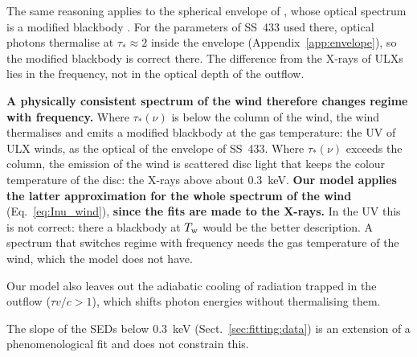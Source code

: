  
The same reasoning applies to the spherical envelope of \citet{Lipunova1999}, whose optical spectrum is a modified blackbody \citep{ZeldovichShakura1969}.
For the parameters of SS~433 used there, optical photons thermalise at $\tau_* \approx 2$ inside the envelope (Appendix~\ref{app:envelope}), so the modified blackbody is correct there.
The difference from the X-rays of ULXs lies in the frequency, not in the optical depth of the outflow.



\textbf{A physically consistent spectrum of the wind therefore changes regime with frequency.}
Where $\tau_*(\nu)$ is below the column of the wind, the wind thermalises and emits a modified blackbody at the gas temperature: the UV of ULX winds, as the optical of the envelope of SS~433.
Where $\tau_*(\nu)$ exceeds the column, the emission of the wind is scattered disc light that keeps the colour temperature of the disc: the X-rays above about 0.3~keV.
\textbf{Our model applies the latter approximation for the whole spectrum of the wind }(Eq.~\ref{eq:Inu_wind}),\textbf{ since the fits are made to the X-rays.}
In the UV this is not correct: there a blackbody at $T_{\rm w}$ would be the better description.
A spectrum that switches regime with frequency needs the gas temperature of the wind, which the model does not have.

Our model also leaves out the adiabatic cooling of radiation trapped in the outflow ($\tau v/c > 1$), which shifts photon energies without thermalising them.

The slope of the SEDs below 0.3~keV (Sect.~\ref{sec:fitting:data}) is an extension of a phenomenological fit and does not constrain this.
